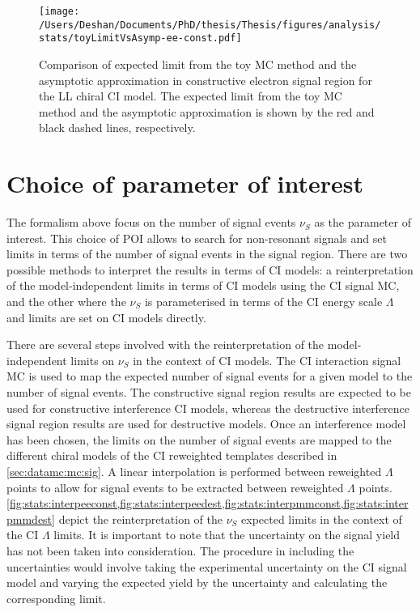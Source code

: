 \begin{figure}[!htpb]
    \centering
    \texttt{[image: /Users/Deshan/Documents/PhD/thesis/Thesis/figures/analysis/stats/toyLimitVsAsymp-ee-const.pdf]}
    \label{fig:asympVstoy1}
    \caption[Comparison of expected limit from the toy MC method and the asymptotic approximation.]{Comparison of expected limit from the toy MC method and the asymptotic approximation in constructive electron signal region for the LL chiral CI model. The expected limit from the toy MC method and the asymptotic approximation is shown by the red and black dashed lines, respectively.}
    \label{fig:asympVstoy}
\end{figure}

\section{Choice of parameter of interest}\label{sec:stat:poi}
The formalism above focus on the number of signal events $\nu_S$ as the parameter of interest. This choice of POI allows to search for non-resonant signals and set limits in terms of the number of signal events in the signal region. There are two possible methods to interpret the results in terms of CI models: a reinterpretation of the model-independent limits in terms of CI models using the CI signal MC, and the other where the $\nu_S$ is parameterised in terms of the CI energy scale $\Lambda$ and limits are set on CI models directly.  

There are several steps involved with the reinterpretation of the model-independent limits on $\nu_S$ in the context of CI models. The CI interaction signal MC is used to map the expected number of signal events for a given model to the number of signal events. The constructive signal region results are expected to be used for constructive interference CI models, whereas the destructive interference signal region results are used for destructive models. Once an interference model has been chosen, the limits on the number of signal events are mapped to the different chiral models of the CI reweighted templates described in \cref{sec:datamc:mc:sig}. A linear interpolation is performed between reweighted $\Lambda$ points to allow for signal events to be extracted between reweighted $\Lambda$ points. \cref{fig:stats:interpeeconst,fig:stats:interpeedest,fig:stats:interpmmconst,fig:stats:interpmmdest} depict the reinterpretation of the $\nu_S$ expected limits in the context of the CI $\Lambda$ limits. It is important to note that the uncertainty on the signal yield has not been taken into consideration. The procedure in including the uncertainties would involve taking the experimental uncertainty on the CI signal model and varying the expected yield by the uncertainty and calculating the corresponding limit. 

